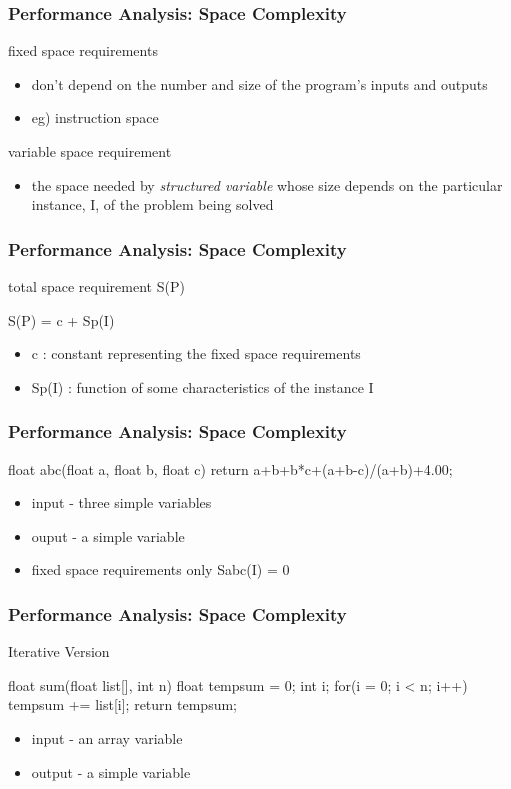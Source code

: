 \documentclass[newPxFont,sthlmFooter,nooffset]{beamer}
\begin{document}
\begin{frame}[t]
  \frametitle{Performance Analysis: Space Complexity}
fixed space requirements
\begin{itemize}
\item don’t depend on the number and size of the program’s inputs and
  outputs
\item eg) instruction space
\end{itemize}

variable space requirement
\begin{itemize}
\item the space needed by \textit{structured variable} whose size depends on
  the particular instance, I, of the problem being solved
\end{itemize}

\end{frame}

\begin{frame}[t, fragile]
  \frametitle{Performance Analysis: Space Complexity}
total space requirement S(P)
\begin{codedef}
  S(P) = c + Sp(I)
\end{codedef}

\begin{itemize}
\item c : constant representing the fixed space requirements 
\item Sp(I) : function of some characteristics of the instance I
\end{itemize}

\end{frame}

\begin{frame}[t, fragile]
  \frametitle{Performance Analysis: Space Complexity}
\begin{codedef}
float abc(float a, float b, float c) { 
   return a+b+b*c+(a+b-c)/(a+b)+4.00;
}    
\end{codedef}
\begin{itemize}
\item input - three simple variables
\item ouput - a simple variable
\item fixed space requirements only Sabc(I) = 0
\end{itemize}

\end{frame}

\begin{frame}[t, fragile]
  \frametitle{Performance Analysis: Space Complexity}
Iterative Version
\begin{codedef}
float sum(float list[], int n) { 
   float tempsum = 0;
   int i;
   for(i = 0; i < n; i++)
      tempsum += list[i];
      return tempsum;
}
\end{codedef}
\begin{itemize}
\item input - an array variable
\item output - a simple variable
\end{itemize}
\end{frame}
\end{document}

